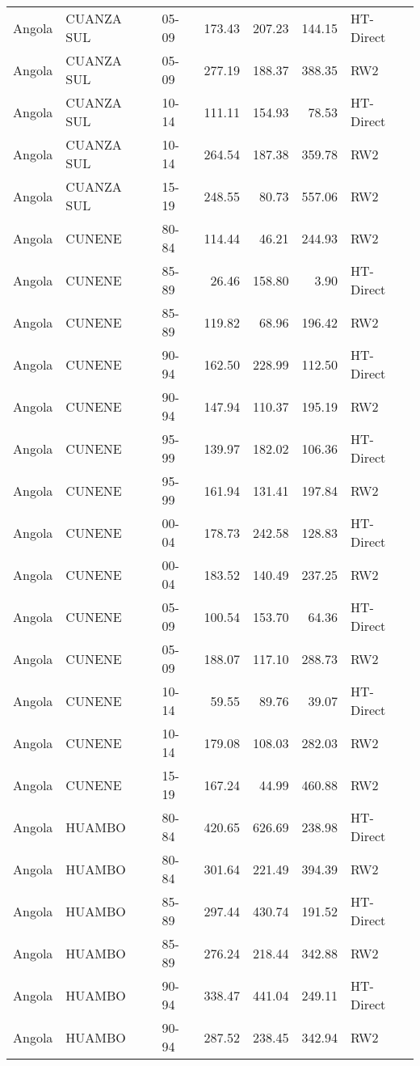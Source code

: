 \begin{longtable}{lllrrrl}
  Angola & CUANZA SUL & 05-09 & 173.43 & 207.23 & 144.15 & HT-Direct \\ 
  Angola & CUANZA SUL & 05-09 & 277.19 & 188.37 & 388.35 & RW2 \\ 
  Angola & CUANZA SUL & 10-14 & 111.11 & 154.93 & 78.53 & HT-Direct \\ 
  Angola & CUANZA SUL & 10-14 & 264.54 & 187.38 & 359.78 & RW2 \\ 
  Angola & CUANZA SUL & 15-19 & 248.55 & 80.73 & 557.06 & RW2 \\ 
  Angola & CUNENE & 80-84 & 114.44 & 46.21 & 244.93 & RW2 \\ 
  Angola & CUNENE & 85-89 & 26.46 & 158.80 & 3.90 & HT-Direct \\ 
  Angola & CUNENE & 85-89 & 119.82 & 68.96 & 196.42 & RW2 \\ 
  Angola & CUNENE & 90-94 & 162.50 & 228.99 & 112.50 & HT-Direct \\ 
  Angola & CUNENE & 90-94 & 147.94 & 110.37 & 195.19 & RW2 \\ 
  Angola & CUNENE & 95-99 & 139.97 & 182.02 & 106.36 & HT-Direct \\ 
  Angola & CUNENE & 95-99 & 161.94 & 131.41 & 197.84 & RW2 \\ 
  Angola & CUNENE & 00-04 & 178.73 & 242.58 & 128.83 & HT-Direct \\ 
  Angola & CUNENE & 00-04 & 183.52 & 140.49 & 237.25 & RW2 \\ 
  Angola & CUNENE & 05-09 & 100.54 & 153.70 & 64.36 & HT-Direct \\ 
  Angola & CUNENE & 05-09 & 188.07 & 117.10 & 288.73 & RW2 \\ 
  Angola & CUNENE & 10-14 & 59.55 & 89.76 & 39.07 & HT-Direct \\ 
  Angola & CUNENE & 10-14 & 179.08 & 108.03 & 282.03 & RW2 \\ 
  Angola & CUNENE & 15-19 & 167.24 & 44.99 & 460.88 & RW2 \\ 
  Angola & HUAMBO & 80-84 & 420.65 & 626.69 & 238.98 & HT-Direct \\ 
  Angola & HUAMBO & 80-84 & 301.64 & 221.49 & 394.39 & RW2 \\ 
  Angola & HUAMBO & 85-89 & 297.44 & 430.74 & 191.52 & HT-Direct \\ 
  Angola & HUAMBO & 85-89 & 276.24 & 218.44 & 342.88 & RW2 \\ 
  Angola & HUAMBO & 90-94 & 338.47 & 441.04 & 249.11 & HT-Direct \\ 
  Angola & HUAMBO & 90-94 & 287.52 & 238.45 & 342.94 & RW2 \\ 

\end{longtable}
